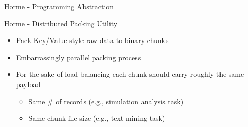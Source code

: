\documentclass[newPxFont]{beamer}
\makeatletter
\newcommand{\specialcell}[2][l]{%
  \begin{tabular}[#1]{@{}l@{}}#2\end{tabular}}
\makeatother
\begin{document}
\begin{frame}[c]{Horme - Programming Abstraction}
\end{frame}

\begin{frame}[c]{Horme - Distributed Packing Utility}
  \begin{itemize}
    \item Pack Key/Value style raw data to binary chunks
    \item Embarrassingly parallel packing process
    \item For the sake of load balancing each chunk should carry roughly the same payload
    \begin{itemize}
      \item Same \# of records (e.g., simulation analysis task)
      \item Same chunk file size (e.g., text mining task)
    \end{itemize}
  \end{itemize}
\end{frame}
\end{document}
